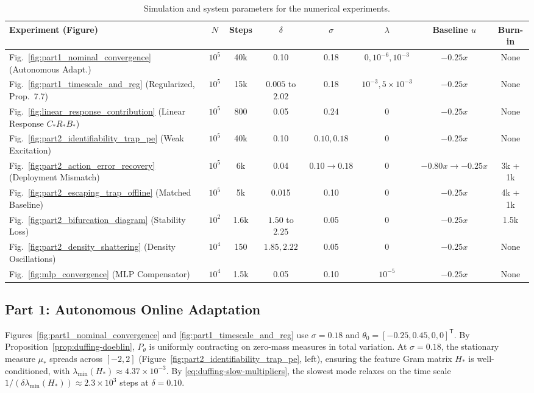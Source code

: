 \begin{table}[htpb]
\centering
\footnotesize
\setlength{\tabcolsep}{3pt}
\begin{tabular}{lccccccc}
\toprule
\textbf{Experiment (Figure)} & $N$ & \textbf{Steps} & $\delta$ & $\sigma$ & $\lambda$ & \textbf{Baseline $u$} & \textbf{Burn-in} \\
\midrule
Fig.~\ref{fig:part1_nominal_convergence} (Autonomous Adapt.) & $10^5$ & 40k & 0.10 & 0.18 & $0, 10^{-6}, 10^{-3}$ & $-0.25x$ & None \\
Fig.~\ref{fig:part1_timescale_and_reg} (Regularized, Prop.~7.7) & $10^5$ & 15k & $0.005$ to $2.02$ & 0.18 & $10^{-3}, 5\times 10^{-3}$ & $-0.25x$ & None \\
Fig.~\ref{fig:linear_response_contribution} (Linear Response $C_*R_*B_*$) & $10^5$ & 800 & 0.05 & 0.24 & $0$ & $-0.25x$ & None \\
Fig.~\ref{fig:part2_identifiability_trap_pe} (Weak Excitation) & $10^5$ & 40k & 0.10 & $0.10, 0.18$ & $0$ & $-0.25x$ & None \\
Fig.~\ref{fig:part2_action_error_recovery} (Deployment Mismatch) & $10^5$ & 6k & 0.04 & $0.10 \to 0.18$ & $0$ & $-0.80x \to -0.25x$ & 3k + 1k \\
Fig.~\ref{fig:part2_escaping_trap_offline} (Matched Baseline) & $10^5$ & 5k & 0.015 & 0.10 & $0$ & $-0.25x$ & 4k + 1k \\
Fig.~\ref{fig:part2_bifurcation_diagram} (Stability Loss) & $10^2$ & 1.6k & $1.50$ to $2.25$ & 0.05 & $0$ & $-0.25x$ & 1.5k \\
Fig.~\ref{fig:part2_density_shattering} (Density Oscillations) & $10^4$ & 150 & $1.85, 2.22$ & 0.05 & $0$ & $-0.25x$ & None \\
Fig.~\ref{fig:mlp_convergence} (MLP Compensator) & $10^4$ & 1.5k & 0.05 & 0.10 & $10^{-5}$ & $-0.25x$ & None \\
\bottomrule
\end{tabular}
\caption{Simulation and system parameters for the numerical experiments.}
\label{tab:parameters}
\end{table}

\subsection{Part 1: Autonomous Online Adaptation}
\label{sec:part1-illustration}

Figures~\ref{fig:part1_nominal_convergence} and \ref{fig:part1_timescale_and_reg} use $\sigma=0.18$ and $\theta_0=[-0.25,0.45,0,0]^{\mathsf T}$. By Proposition~\ref{prop:duffing-doeblin}, $P_\theta$ is uniformly contracting on zero-mass measures in total variation. At $\sigma=0.18$, the stationary measure $\mu_*$ spreads across $[-2,2]$ (Figure~\ref{fig:part2_identifiability_trap_pe}, left), ensuring the feature Gram matrix $H_*$ is well-conditioned, with $\lambda_{\min}(H_*) \approx 4.37\times 10^{-3}$. By \eqref{eq:duffing-slow-multipliers}, the slowest mode relaxes on the time scale $1/(\delta\lambda_{\min}(H_*)) \approx 2.3\times 10^{3}$ steps at $\delta=0.10$.

